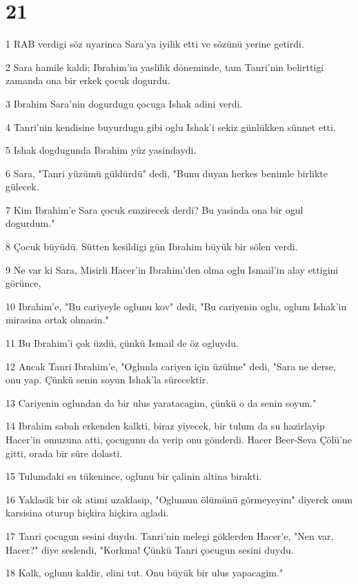 \chapter{21}

\par 1 RAB verdigi söz uyarinca Sara'ya iyilik etti ve sözünü yerine getirdi.
\par 2 Sara hamile kaldi; Ibrahim'in yaslilik döneminde, tam Tanri'nin belirttigi zamanda ona bir erkek çocuk dogurdu.
\par 3 Ibrahim Sara'nin dogurdugu çocuga Ishak adini verdi.
\par 4 Tanri'nin kendisine buyurdugu gibi oglu Ishak'i sekiz günlükken sünnet etti.
\par 5 Ishak dogdugunda Ibrahim yüz yasindaydi.
\par 6 Sara, "Tanri yüzümü güldürdü" dedi, "Bunu duyan herkes benimle birlikte gülecek.
\par 7 Kim Ibrahim'e Sara çocuk emzirecek derdi? Bu yasinda ona bir ogul dogurdum."
\par 8 Çocuk büyüdü. Sütten kesildigi gün Ibrahim büyük bir sölen verdi.
\par 9 Ne var ki Sara, Misirli Hacer'in Ibrahim'den olma oglu Ismail'in alay ettigini görünce,
\par 10 Ibrahim'e, "Bu cariyeyle oglunu kov" dedi, "Bu cariyenin oglu, oglum Ishak'in mirasina ortak olmasin."
\par 11 Bu Ibrahim'i çok üzdü, çünkü Ismail de öz ogluydu.
\par 12 Ancak Tanri Ibrahim'e, "Oglunla cariyen için üzülme" dedi, "Sara ne derse, onu yap. Çünkü senin soyun Ishak'la sürecektir.
\par 13 Cariyenin oglundan da bir ulus yaratacagim, çünkü o da senin soyun."
\par 14 Ibrahim sabah erkenden kalkti, biraz yiyecek, bir tulum da su hazirlayip Hacer'in omuzuna atti, çocugunu da verip onu gönderdi. Hacer Beer-Seva Çölü'ne gitti, orada bir süre dolasti.
\par 15 Tulumdaki su tükenince, oglunu bir çalinin altina birakti.
\par 16 Yaklasik bir ok atimi uzaklasip, "Oglumun ölümünü görmeyeyim" diyerek onun karsisina oturup hiçkira hiçkira agladi.
\par 17 Tanri çocugun sesini duydu. Tanri'nin melegi göklerden Hacer'e, "Nen var, Hacer?" diye seslendi, "Korkma! Çünkü Tanri çocugun sesini duydu.
\par 18 Kalk, oglunu kaldir, elini tut. Onu büyük bir ulus yapacagim."
